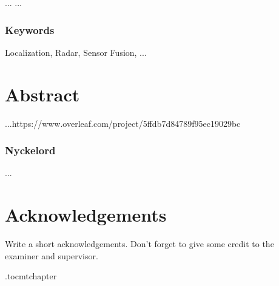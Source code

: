 ...
\vspace{2cm}
...





\subsection*{Keywords}
Localization, Radar, Sensor Fusion,  ...





\newpage
\thispagestyle{plain}
\chapter*{Abstract}
...https://www.overleaf.com/project/5ffdb7d84789f95ec19029bc

\subsection*{Nyckelord}
...


\newpage
\thispagestyle{plain}
\chapter*{Acknowledgements}
Write a short acknowledgements. Don't forget to give some credit to the examiner and supervisor.

\newpage



\newpage

\etocdepthtag.toc{mtchapter}
\thispagestyle{plain}
\tableofcontents

\newpage


